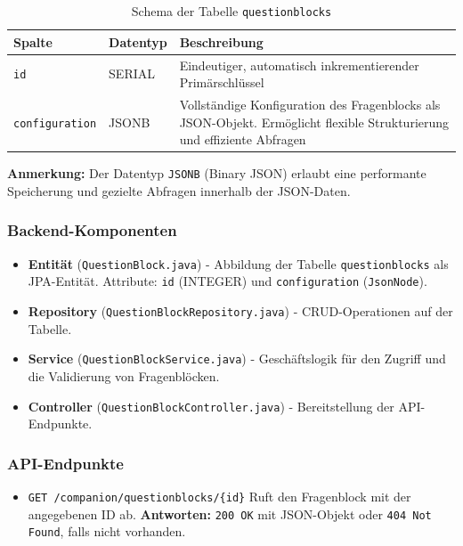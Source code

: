 \documentclass[12pt,a4paper]{report}
\begin{document}
        \begin{table}[!htbp]
            \centering
            \begin{tabular}{|l|l|p{9cm}|}
                \hline
                    \textbf{Spalte} & \textbf{Datentyp} & \textbf{Beschreibung} \\
                \hline
                    \texttt{id} & SERIAL & Eindeutiger, automatisch inkrementierender Primärschlüssel \\
                    \texttt{configuration} & JSONB & Vollständige Konfiguration des Fragenblocks als JSON-Objekt.
                    Ermöglicht flexible Strukturierung und effiziente Abfragen \\
                \hline
            \end{tabular}
            \caption{Schema der Tabelle \texttt{questionblocks}}
            \label{tab:questionblocks_schema}
        \end{table}

        \noindent
        \textbf{Anmerkung:} Der Datentyp \texttt{JSONB} (Binary JSON) erlaubt eine performante Speicherung und gezielte Abfragen innerhalb der JSON-Daten.

    \subsubsection{Backend-Komponenten}
        \begin{itemize}
            \item \textbf{Entität} (\texttt{QuestionBlock.java}) - Abbildung der Tabelle \texttt{questionblocks} als JPA-Entität.
                Attribute: \texttt{id} (INTEGER) und \texttt{configuration} (\texttt{JsonNode}).
            \item \textbf{Repository} (\texttt{QuestionBlockRepository.java}) - CRUD-Operationen auf der Tabelle.
            \item \textbf{Service} (\texttt{QuestionBlockService.java}) - Geschäftslogik für den Zugriff und die Validierung von Fragenblöcken.
            \item \textbf{Controller} (\texttt{QuestionBlockController.java}) - Bereitstellung der API-Endpunkte.
        \end{itemize}

    \subsubsection{API-Endpunkte}
        \begin{itemize}
            \item \texttt{GET /companion/questionblocks/\{id\}}
                Ruft den Fragenblock mit der angegebenen ID ab.
                \textbf{Antworten:} \texttt{200 OK} mit JSON-Objekt oder \texttt{404 Not Found}, falls nicht vorhanden.
        \end{itemize}
\end{document}
